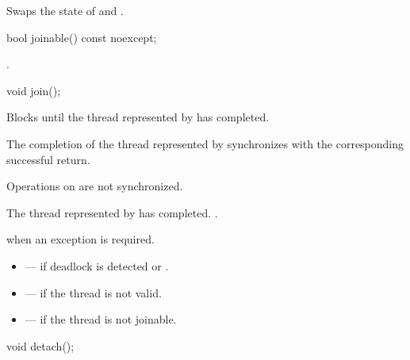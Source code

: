 \begin{itemdescr}
\pnum
\effects
Swaps the state of  and .
\end{itemdescr}

%
\begin{itemdecl}
bool joinable() const noexcept;
\end{itemdecl}

\begin{itemdescr}
\pnum
\returns
{}.
\end{itemdescr}

%
\begin{itemdecl}
void join();
\end{itemdecl}

\begin{itemdescr}
\pnum
\effects
Blocks until the thread represented by  has completed.

\pnum
\sync
The completion of the thread represented by  synchronizes with
the corresponding successful
 return.
\begin{note}
Operations on
 are not synchronized.
\end{note}

\pnum
\ensures
The thread represented by  has completed. .

\pnum
\throws
{} when
an exception is required.

\pnum
\errors
\begin{itemize}
\item {} --- if deadlock is detected or
.

\item {} --- if the thread is not valid.

\item {} --- if the thread is not joinable.
\end{itemize}
\end{itemdescr}

%
\begin{itemdecl}
void detach();
\end{itemdecl}

